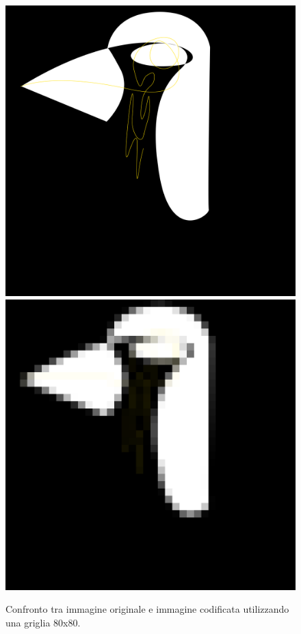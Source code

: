 \begin{figure}[htb] \centering
\includegraphics[scale=0.08]{Pictures/in ricordo del pinguino cameriere.png}
\qquad\qquad
\includegraphics[scale=0.08]{Pictures/canvas80x80.png}
\caption{Confronto tra immagine originale e immagine codificata utilizzando una griglia 80x80.}\label{fig:figura}
\end{figure}

